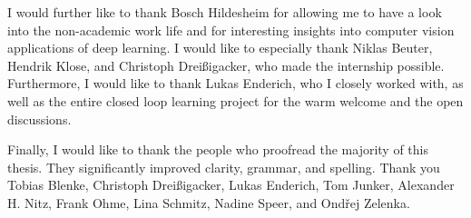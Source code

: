 I would further like to thank Bosch Hildesheim for allowing me to have a look into the non-academic work life and for interesting insights into computer vision applications of deep learning. I would like to especially thank Niklas Beuter, Hendrik Klose, and Christoph Dreißigacker, who made the internship possible. Furthermore, I would like to thank Lukas Enderich, who I closely worked with, as well as the entire closed loop learning project for the warm welcome and the open discussions.

Finally, I would like to thank the people who proofread the majority of this thesis. They significantly improved clarity, grammar, and spelling. Thank you Tobias Blenke, Christoph Dreißigacker, Lukas Enderich, Tom Junker, Alexander H. Nitz, Frank Ohme, Lina Schmitz, Nadine Speer, and Ond\v{r}ej Zelenka.
